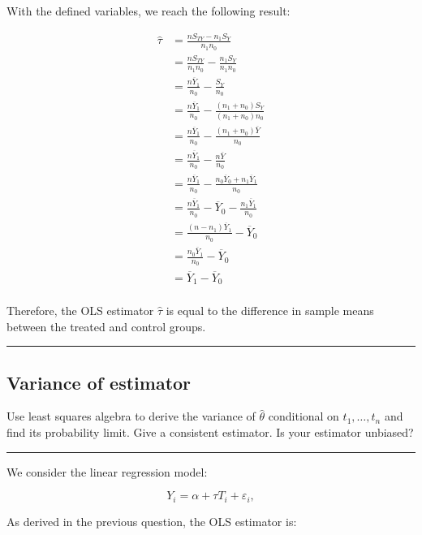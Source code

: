 \documentclass{article}
\newenvironment{colorparagraph}[1]{\par\color{#1}}{\par}
\begin{document}
With the defined variables, we reach the following result:

\begin{align*}
  \hat{\tau} &= \frac{n S_{TY} - n_1 S_Y}{n_1 n_0} \\
             &= \frac{n S_{TY}}{n_1 n_0} - \frac{n_1 S_Y}{n_1 n_0} \\
             &= \frac{n \overline{Y}_1}{n_0} - \frac{S_Y}{n_0} \\
             &= \frac{n \overline{Y}_1}{n_0} - \frac{(n_1 + n_0) S_Y}{(n_1 + n_0)n_0} \\
             &= \frac{n \overline{Y}_1}{n_0} - \frac{(n_1 + n_0) \overline{Y}}{n_0} \\
             &= \frac{n \overline{Y}_1}{n_0} - \frac{n \overline{Y}}{n_0} \\
             &= \frac{n \overline{Y}_1}{n_0} - \frac{n_0 \overline{Y}_0 + n_1 \overline{Y}_1}{n_0} \\
             &= \frac{n \overline{Y}_1}{n_0} - \overline{Y}_0 - \frac{n_1 \overline{Y}_1}{n_0} \\
             &= \frac{(n - n_1) \overline{Y}_1}{n_0} - \overline{Y}_0 \\
             &= \frac{n_0 \overline{Y}_1}{n_0} - \overline{Y}_0 \\
             &= \overline{Y}_1 - \overline{Y}_0 \\
\end{align*}

Therefore, the OLS estimator \(\hat{\tau}\) is equal to the difference in sample means between the treated and control groups.

\begin{colorparagraph}{questioncolor}
\rule{\textwidth}{0.5pt}

\label{q2e}\subsection{Variance of estimator}
Use least squares algebra to derive the variance of \(\hat{\theta}\) conditional on \(t_1, \dots, t_n\) and find its probability limit. Give a consistent estimator. Is your estimator unbiased?

\rule{\textwidth}{0.5pt}
\end{colorparagraph}

We consider the linear regression model:

\[
Y_i = \alpha + \tau T_i + \varepsilon_i,
\]

As derived in the previous question, the OLS estimator is:
\end{document}
